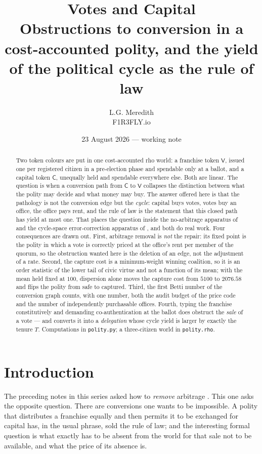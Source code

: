 \documentclass[11pt]{article}
\title{\bfseries Votes and Capital\\[0.35em]
\large Obstructions to conversion in a cost-accounted polity,
and the yield of the political cycle as the rule of law}
\author{L.G. Meredith\\ \small F1R3FLY.io}
\date{23 August 2026 --- working note}
\theoremstyle{plain}
\theoremstyle{definition}
\theoremstyle{remark}
\newcommand{\Vt}{\mathsf{V}}
\newcommand{\Ct}{\mathsf{C}}
\begin{document}
\maketitle

\begin{abstract}
Two token colours are put in one cost-accounted rho world: a franchise token
$\Vt$, issued one per registered citizen in a pre-election phase and spendable
only at a ballot, and a capital token $\Ct$, unequally held and spendable
everywhere else. Both are linear. The question is when a conversion path from
$\Ct$ to $\Vt$ collapses the distinction between what the polity may decide and
what money may buy. The answer offered here is that the pathology is not the
conversion edge but the \emph{cycle}: capital buys votes, votes buy an office,
the office pays rent, and the rule of law is the statement that this closed
path has yield at most one. That places the question inside the no-arbitrage
apparatus of \cite{vtok} and the cycle-space error-correction apparatus of
\cite{engine}, and both do real work. Four consequences are drawn out. First,
arbitrage removal is \emph{not} the repair: its fixed point is the polity in
which a vote is correctly priced at the office's rent per member of the quorum,
so the obstruction wanted here is the deletion of an edge, not the adjustment
of a rate. Second, the capture cost is a minimum-weight winning coalition, so
it is an order statistic of the lower tail of civic virtue and not a function
of its mean; with the mean held fixed at $100$, dispersion alone moves the
capture cost from $5100$ to $2076.58$ and flips the polity from safe to
captured. Third, the first Betti number of the conversion graph counts, with
one number, both the audit budget of the price code and the number of
independently purchasable offices. Fourth, typing the franchise
constitutively and demanding co-authentication at the ballot does obstruct the
\emph{sale} of a vote --- and converts it into a \emph{delegation} whose cycle
yield is larger by exactly the tenure $T$. Computations in \texttt{polity.py};
a three-citizen world in \texttt{polity.rho}.
\end{abstract}

\section{Introduction}

The preceding notes in this series asked how to \emph{remove} arbitrage
\cite{vtok,engine}. This one asks the opposite question. There are conversions
one wants to be impossible. A polity that distributes a franchise equally and
then permits it to be exchanged for capital has, in the usual phrase, sold the
rule of law; and the interesting formal question is what exactly has to be
absent from the world for that sale not to be available, and what the price of
its absence is.
\end{document}
